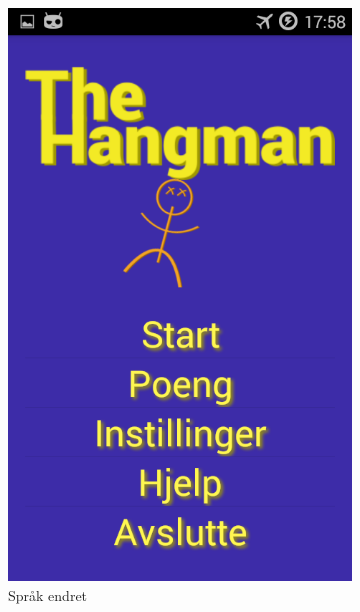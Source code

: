 \begin{figure}[ht]
    \centering
   \begin{subfigure}[b]{0.3\textwidth}
        \includegraphics[width=\textwidth]{./img/bruksanvisning/10.png}
        \caption{Språk endret}
        \label{fig:innstillinger_endret}
    \end{subfigure}
    \begin{subfigure}[b]{0.3\textwidth}

\end{subfigure}
\end{figure}
